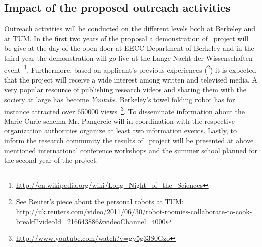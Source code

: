 \subsection{Impact of the proposed outreach activities}
Outreach activities will be conducted on the different levels both at Berkeley
and at TUM. In the first two years of the proposal a demonstration of \ksem\
project will be give at the day of the open door at EECC Department of Berkeley and
in the third year the demonstration will go live at the Lange Nacht der Wissenschaften
event~\footnote{\url{http://en.wikipedia.org/wiki/Long_Night_of_the_Sciences}}.
Furthermore, based on applicant's previous experiences (\footnote{See Reuter's piece about
the personal robots at TUM: 
\url{http://uk.reuters.com/video/2011/06/30/robot-roomies-collaborate-to-cook-breakf?videoId=216643886&videoChannel=4000}}) 
it is expected that the project will receive a wide interest among written and televised media.
A very popular resource of publishing research videos and sharing them with the society at large
has become \emph{Youtube}. Berkeley's towel folding robot has for instance attracted over 650000 
views~\footnote{\url{http://www.youtube.com/watch?v=gy5g33S0Gzo}}. To disseminate information about
the Marie Curie schema Mr. Pangercic will in coordination with the respective organization authorities
organize at least two information events. Lastly, to inform the research community the results of 
\ksem\ project will be presented at above mentioned international conference workshops and the summer school planned for
the second year of the project.
 
\newpage